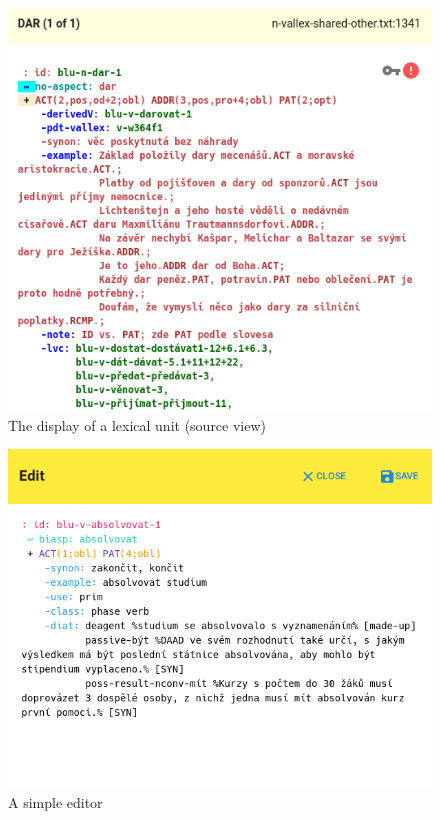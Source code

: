 \documentclass[10pt, a4paper]{article}
\begin{document}
\begin{figure}
    \includegraphics[width=\hsize]{images/ui-lexical-unit-src.png}
    \caption{\label{fig:ui-lexical-unit-src}The display of a lexical unit (source view)}
\end{figure}



\begin{figure}
    \includegraphics[width=\hsize]{images/ui-editing.png}
    \caption{\label{fig:ui-editing}A simple editor}
\end{figure}
\end{document}
